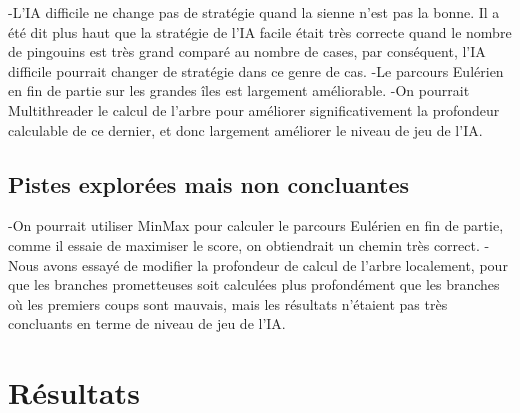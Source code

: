 \documentclass{report}
\begin{document}
-L'IA difficile ne change pas de stratégie quand la sienne n'est pas la bonne. Il a été dit plus haut que la stratégie de l'IA facile était très correcte quand le nombre de pingouins est très grand comparé au nombre de cases, par conséquent, l'IA difficile pourrait changer de stratégie dans ce genre de cas.
\newline
-Le parcours Eulérien en fin de partie sur les grandes îles est largement améliorable.
\newline 
-On pourrait Multithreader le calcul de l'arbre pour améliorer significativement la profondeur calculable de ce dernier, et donc largement améliorer le niveau de jeu de l'IA.

\section{Pistes explorées mais non concluantes}
-On pourrait utiliser MinMax pour calculer le parcours Eulérien en fin de partie, comme il essaie de maximiser le score, on obtiendrait un chemin très correct.
\newline
-Nous avons essayé de modifier la profondeur de calcul de l'arbre localement, pour que les branches prometteuses soit calculées plus profondément que les branches où les premiers coups sont mauvais, mais les résultats n’étaient pas très concluants en terme de niveau de jeu de l'IA.











\chapter{Résultats}
\end{document}
